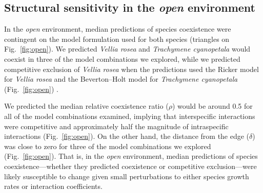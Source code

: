 \begin{refsection}
\begin{table}[H]
\centering
\fontsize{12}{10}\selectfont
\caption{Model comparison in the \emph{open} and \emph{woody} environments. LOOIC (leave-one-out cross-validation information criteria) penalizes models for the number of parameters, and the lowest value reflects the best-performing model. The weight for each model is an estimate of the probability that the model will make the best predictions of new data based on the the set of models considered.}
\label{tab:compare}
\end{table}

\subsection*{Structural sensitivity in the \emph{open} environment}

In the \textit{open} environment, median predictions of species coexistence were contingent on the model formulation used for both species (triangles on Fig.~\ref{fig:open}). We predicted \textit{Vellia rosea} and \textit{Trachymene cyanopetala} would coexist in three of the model combinations we explored, while we predicted competitive exclusion of \textit{Vellia rosea} when the predictions used the Ricker model for \textit{Vellia rosea} and the Beverton--Holt model for \textit{Trachymene cyanopetala} (Fig.~\ref{fig:open}) .

We predicted the median relative coexistence ratio ($\rho$) would be around 0.5 for all of the model combinations examined, implying that interspecific interactions were competitive and approximately half the magnitude of intraspecific interactions (Fig.~\ref{fig:open}). On the other hand, the distance from the edge ($\delta$) was close to zero for three of the model combinations we explored (Fig.~\ref{fig:open}). That is, in the \textit{open} environment, median predictions of species coexistence---whether they predicted coexistence or competitive exclusion---were likely susceptible to change given small perturbations to either species growth rates or interaction coefficients.




\end{refsection}
